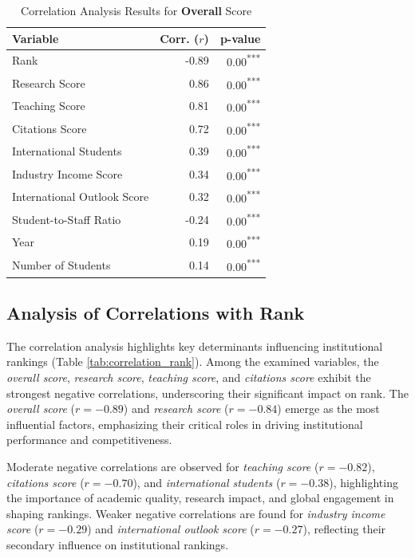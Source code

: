 \documentclass[sigconf]{acmart}
\begin{document}
\begin{table}[h!]
	\centering
	\caption{Correlation Analysis Results for \textbf{Overall} Score}
	\label{tab:correlation_overall}
	\begin{tabular}{|l|r|r|}
		\hline
		\textbf{Variable} & \textbf{Corr. ($r$)} & \textbf{p-value} \\
		\hline
		Rank & -0.89 & 0.00\textsuperscript{***} \\
		Research Score & 0.86 & 0.00\textsuperscript{***} \\
		Teaching Score & 0.81 & 0.00\textsuperscript{***} \\
		Citations Score & 0.72 & 0.00\textsuperscript{***} \\
		International Students & 0.39 & 0.00\textsuperscript{***} \\
		Industry Income Score & 0.34 & 0.00\textsuperscript{***} \\
		International Outlook Score & 0.32 & 0.00\textsuperscript{***} \\
		Student-to-Staff Ratio & -0.24 & 0.00\textsuperscript{***} \\
		Year & 0.19 & 0.00\textsuperscript{***} \\
		Number of Students & 0.14 & 0.00\textsuperscript{***} \\
		\hline
	\end{tabular}
\end{table}



\subsection{Analysis of Correlations with Rank}

The correlation analysis highlights key determinants influencing institutional rankings (Table \ref{tab:correlation_rank}). Among the examined variables, the \textit{overall score}, \textit{research score}, \textit{teaching score}, and \textit{citations score} exhibit the strongest negative correlations, underscoring their significant impact on rank. The \textit{overall score} ($r = -0.89$) and \textit{research score} ($r = -0.84$) emerge as the most influential factors, emphasizing their critical roles in driving institutional performance and competitiveness.

Moderate negative correlations are observed for \textit{teaching score} ($r = -0.82$), \textit{citations score} ($r = -0.70$), and \textit{international students} ($r = -0.38$), highlighting the importance of academic quality, research impact, and global engagement in shaping rankings. Weaker negative correlations are found for \textit{industry income score} ($r = -0.29$) and \textit{international outlook score} ($r = -0.27$), reflecting their secondary influence on institutional rankings.
\end{document}
